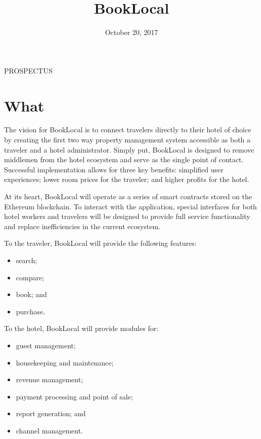 \documentclass{article}
\title{BookLocal}
\begin{document}
\date{October 20, 2017}

\maketitle

\begin{flushleft}
\centering PROSPECTUS
\end{flushleft}

\newpage
\tableofcontents

\newpage

\section{What}
The vision for BookLocal is to connect travelers directly to their hotel of choice by creating the first two way property management system accessible as both a traveler and a hotel administrator. Simply put, BookLocal is designed to remove middlemen from the hotel ecosystem and serve as the single point of contact. Successful implementation allows for three key benefits: simplified user experiences; lower room prices for the traveler; and higher profits for the hotel.  

\begin{flushleft}
At its heart, BookLocal will operate as a series of smart contracts stored on the Ethereum blockchain. To interact with the application, special interfaces for both hotel workers and travelers will be designed to provide full service functionality and replace inefficiencies in the current ecosystem.
\end{flushleft}

\begin{flushleft}
To the traveler, BookLocal will provide the following features:
\begin{itemize}
 \item search;
 \item compare;
 \item book; and
 \item purchase.
\end{itemize}
\end{flushleft}

\begin{flushleft}
To the hotel, BookLocal will provide modules for:
\begin{itemize}
 \item guest management;
 \item housekeeping and maintenance;
 \item revenue management;
 \item payment processing and point of sale;
 \item report generation; and
 \item channel management.
\end{itemize}
\end{flushleft}
\end{document}
